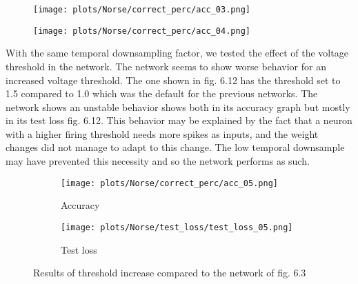 \documentclass[12pt]{report}
\begin{document}
\begin{figure}
\centering
\begin{minipage}{.4\textwidth}
  \centering
  \texttt{[image: plots/Norse/correct\_perc/acc\_03.png]}
  \label{fig:test1}
\end{minipage}
\begin{minipage}{.4\textwidth}
  \centering
  \texttt{[image: plots/Norse/correct\_perc/acc\_04.png]}
  \label{fig:test2}
\end{minipage}
\end{figure}

With the same temporal downsampling factor, we tested the effect of the voltage threshold in the network. The network seems to show worse behavior for an increased voltage threshold. The one shown in fig. 6.12 has the threshold set to 1.5 compared to 1.0 which was the default for the previous networks. The network shows an unstable behavior shows both in its accuracy graph but mostly in its test loss fig. 6.12. This behavior may be explained by the fact that a neuron with a higher firing threshold needs more spikes as inputs, and the weight changes did not manage to adapt to this change. The low temporal downsample may have prevented this necessity and so the network performs as such.

\begin{figure}
\centering
\begin{subfigure}{.5\textwidth}
  \centering
  \texttt{[image: plots/Norse/correct\_perc/acc\_05.png]}
  \caption{Accuracy}
  \label{fig:sub1}
\end{subfigure}%
\begin{subfigure}{.5\textwidth}
  \centering
  \texttt{[image: plots/Norse/test\_loss/test\_loss\_05.png]}
  \caption{Test loss}
  \label{fig:sub2}
\end{subfigure}
\caption{Results of threshold increase compared to the network of fig. 6.3}
\label{fig:test}
\end{figure}
\end{document}
